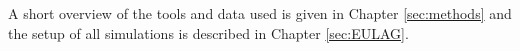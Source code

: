 A short overview of the tools and data used is given in Chapter \ref{sec:methods} and the setup of all simulations is described in Chapter \ref{sec:EULAG}.
















